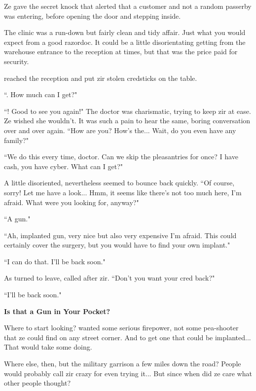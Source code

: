 Ze gave the secret knock that alerted \razordoc{} that a customer and not a random passerby was entering, before opening the door and stepping inside.

The clinic was a run-down but fairly clean and tidy affair. Just what you would expect from a good razordoc. It could be a little disorientating getting from the warehouse entrance to the reception at times, but that was the price paid for security.

\protagonist{} reached the reception and put zir stolen credsticks on the table.

``\razordoc{}. How much can I get?"

``\protagonist{}! Good to see you again!" The doctor was charismatic, trying to keep zir at ease. Ze wished she wouldn't. It was such a pain to hear the same, boring conversation over and over again. ``How are you? How's the... Wait, do you even have any family?"

``We do this every time, doctor. Can we skip the pleasantries for once? I have cash, you have cyber. What can I get?"

A little disoriented, \razordoc{} nevertheless seemed to bounce back quickly. ``Of course, sorry! Let me have a look... Hmm, it seems like there's not too much here, I'm afraid. What were you looking for, anyway?"

``A gun."

``Ah, implanted gun, very nice but also very expensive I'm afraid. This could certainly cover the surgery, but you would have to find your own implant."

``I can do that. I'll be back soon."

As \protagonist{} turned to leave, \razordoc{} called after zir. ``Don't you want your cred back?"

``I'll be back soon."


\textbf{Is that a Gun in Your Pocket?}

Where to start looking? \protagonist{} wanted some serious firepower, not some pea-shooter that ze could find on any street corner. And to get one that could be implanted... That would take some doing.

Where else, then, but the military garrison a few miles down the road? People would probably call zir crazy for even trying it... But since when did ze care what other people thought?

